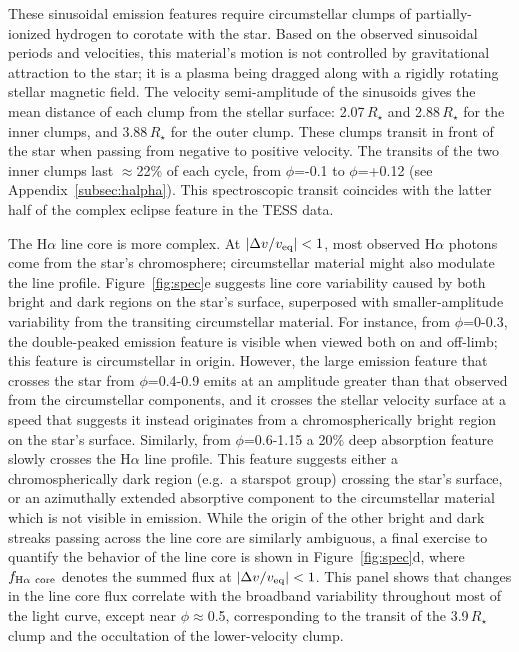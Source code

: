 \documentclass[11pt,twocolumn,tighten,linenumbers]{aastex7}
\begin{document}
These sinusoidal emission features require circumstellar clumps of
partially-ionized hydrogen to corotate with the star.  Based on the
observed sinusoidal periods and velocities, this material's motion is
not controlled by gravitational attraction to the star; it is 
a plasma being dragged along with a rigidly rotating stellar magnetic
field.  The velocity semi-amplitude of the sinusoids gives the mean
distance of each clump from the stellar surface: 2.07\,$R_\star$ and
2.88\,$R_\star$ for the inner clumps, and 3.88\,$R_\star$ for the outer
clump.   These clumps transit in front of the star when passing from
negative to positive velocity.  The transits of the two inner clumps
last $\approx$22\% of each cycle, from $\phi$=-0.1 to $\phi$=+0.12 (see
Appendix~\ref{subsec:halpha}).  This spectroscopic transit coincides
with the latter half of the complex eclipse feature in the TESS data.

The H$\alpha$ line core is more complex.  At $|\Delta v / v_{\rm
eq}|<1$, most observed H$\alpha$ photons come from the star's
chromosphere; circumstellar material might also modulate the line
profile.  Figure~\ref{fig:spec}e suggests line core variability caused
by both bright and dark regions on the star's surface, superposed with
smaller-amplitude variability from the transiting circumstellar
material.  For instance, from $\phi$=0-0.3, the double-peaked emission
feature is visible when viewed both on and off-limb; this feature is
circumstellar in origin.  However, the large emission feature that
crosses the star from $\phi$=0.4-0.9 emits at an amplitude greater
than that observed from the circumstellar components, and it crosses
the stellar velocity surface at a speed that suggests it instead
originates from a chromospherically bright region on the star's
surface.  Similarly, from $\phi$=0.6-1.15 a 20\% deep absorption
feature slowly crosses the H$\alpha$ line profile.  This feature
suggests either a chromospherically dark region (e.g.~a starspot
group) crossing the star's surface, or an azimuthally extended
absorptive component to the circumstellar material which is not
visible in emission.  While the origin of the other bright and dark
streaks passing across the line core are similarly ambiguous, a final
exercise to quantify the behavior of the line core is shown in
Figure~\ref{fig:spec}d, where $f_{\rm H\alpha\ core}$ denotes the
summed flux at $|\Delta v / v_{\rm eq}|<1$.  This panel shows that
changes in the line core flux correlate with the broadband variability
throughout most of the light curve, except near $\phi$$\approx$0.5,
corresponding to the transit of the 3.9\,$R_\star$ clump and the
occultation of the lower-velocity clump.
\end{document}
